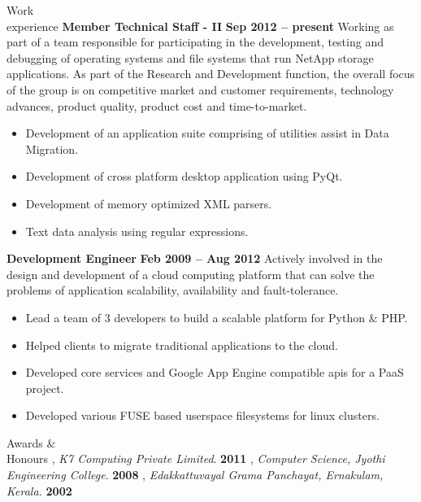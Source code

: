 \documentclass{resume}
\begin{document}
\begin{category}{Work \\experience}
  \citemnobullet \textbf{Member Technical Staff - II} \hfill \textbf{Sep 2012 -- present}
  \citemnobullet Working as part of a team responsible for participating in the development, 
  testing and debugging of operating systems and file systems that run NetApp storage applications. 
  As part of the Research and Development function, the overall focus of the group is on 
  competitive market and customer requirements, technology advances, product quality, 
  product cost and time-to-market.
  \begin{itemize}
  \item Development of an application suite comprising of utilities assist in Data Migration.
  \item Development of cross platform desktop application using PyQt.
  \item Development of memory optimized XML parsers.
  \item Text data analysis using regular expressions.
  \end{itemize}
  \citemnobullet \textbf{Development Engineer} \hfill \textbf{Feb 2009 -- Aug 2012}
  \citemnobullet Actively involved in the design and development of a cloud computing platform 
  that can solve the problems of application scalability, availability and fault-tolerance.
  \begin{itemize} 
  \item Lead a team of 3 developers to build a scalable platform for Python \& PHP.
  \item Helped clients to migrate traditional applications to the cloud.
  \item Developed core services and Google App Engine compatible apis for a PaaS project.
  \item Developed various FUSE based userspace filesystems for linux clusters.
  \end{itemize}
\end{category}

\newpage


\begin{category}{Awards \&\\ Honours}
  , {\em K7 Computing Private Limited}. \hfill \textbf{2011}
  , {\em Computer Science, Jyothi Engineering College}. \hfill \textbf{2008}
  , {\em Edakkattuvayal Grama Panchayat, Ernakulam, Kerala.} \hfill \textbf{2002}
\end{category}
\end{document}
